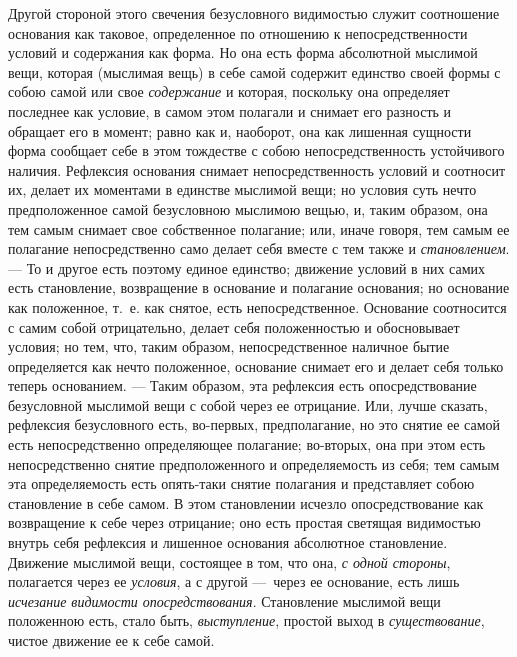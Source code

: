 Другой стороной этого свечения безусловного видимостью служит соотношение
основания как таковое, определенное по отношению к непосредственности
условий и содержания как форма. Но она есть форма абсолютной мыслимой вещи,
которая (мыслимая вещь) в себе самой содержит единство своей формы с собою
самой или свое {\em содержание} и которая, поскольку
она определяет последнее как условие, в самом этом полагали и снимает его
разность и обращает его в момент; равно как и, наоборот, она как лишенная
сущности форма сообщает себе в этом тождестве с собою непосредственность
устойчивого наличия. Рефлексия основания снимает непосредственность условий
и соотносит их, делает их моментами в единстве мыслимой вещи; но условия
суть нечто предположенное самой безусловною мыслимою вещью, и, таким
образом, она тем самым снимает свое собственное полагание; или, иначе
говоря, тем самым ее полагание непосредственно само делает себя вместе с
тем также и {\em становлением}. — То и другое есть
поэтому единое единство; движение условий в них самих есть становление,
возвращение в основание и полагание основания; но основание как положенное,
т.~е. как снятое, есть непосредственное. Основание соотносится с самим
собой отрицательно, делает себя положенностью и обосновывает условия; но
тем, что, таким образом, непосредственное наличное бытие определяется как
нечто положенное, основание снимает его и делает себя только теперь
основанием. — Таким образом, эта рефлексия есть опосредствование
безусловной мыслимой вещи с собой через ее отрицание. Или, лучше сказать,
рефлексия безусловного есть, во-первых, предполагание, но это снятие ее
самой есть непосредственно определяющее полагание; во-вторых, она при этом
есть непосредственно снятие предположенного и определяемость из себя; тем
самым эта определяемость есть опять-таки снятие полагания и представляет
собою становление в себе самом. В этом становлении исчезло опосредствование
как возвращение к себе через отрицание; оно есть простая светящая
видимостью внутрь себя рефлексия и лишенное основания абсолютное
становление. Движение мыслимой вещи, состоящее в том, что она,
{\em с одной стороны}, полагается через ее
{\em условия}, а с другой —~через ее основание, есть
лишь {\em исчезание видимости опосредствования}.
Становление мыслимой вещи положенною есть, стало быть,
{\em выступление}, простой выход в
{\em существование}, чистое движение ее к себе самой.

